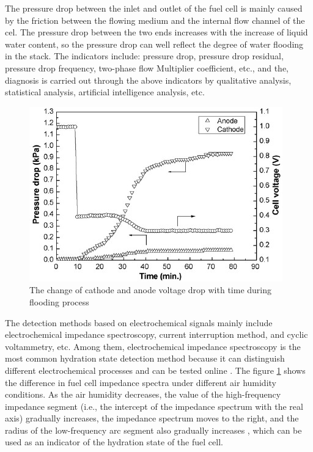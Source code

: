 \par
The pressure drop between the inlet and outlet of the fuel cell is mainly caused by the friction between the flowing medium and the internal flow channel of the cel\cite{wuDiagnosticToolsPEM2008}. The pressure drop between the two ends increases with the increase of liquid water content, so the pressure drop can well reflect the degree of water flooding in the stack. The indicators include: pressure drop, pressure drop residual, pressure drop frequency, two-phase flow Multiplier coefficient, etc., and the, diagnosis is carried out through the above indicators by qualitative analysis, statistical analysis, artificial intelligence analysis, etc.\cite{liNovelApproachDetermine2017}
\par
\begin{figure}[h]
	\centering

	\includegraphics{Research_pictures/Fig1.jpg}
	\caption[short]{The change of cathode and anode voltage drop with time during flooding process}
	\label{fig:figure1}
\end{figure}
The detection methods based on electrochemical signals mainly include electrochemical impedance spectroscopy, current interruption method, and cyclic voltammetry, etc. Among them, electrochemical impedance spectroscopy is the most common hydration state detection method because it can distinguish different electrochemical processes and can be tested online \cite{yousfisteinerDiagnosisPolymerElectrolyte2011,chenOperationCharacteristicsCarbon2015}. The figure \ref{fig:figure1} shows the difference in fuel cell impedance spectra under different air humidity conditions. As the air humidity decreases, the value of the high-frequency impedance segment (i.e., the intercept of the impedance spectrum with the real axis) gradually increases, the impedance spectrum moves to the right, and the radius of the low-frequency arc segment also gradually increases \cite{hussainiVisualizationQuantificationCathode2009}, which can be used as an indicator of the hydration state of the fuel cell.
